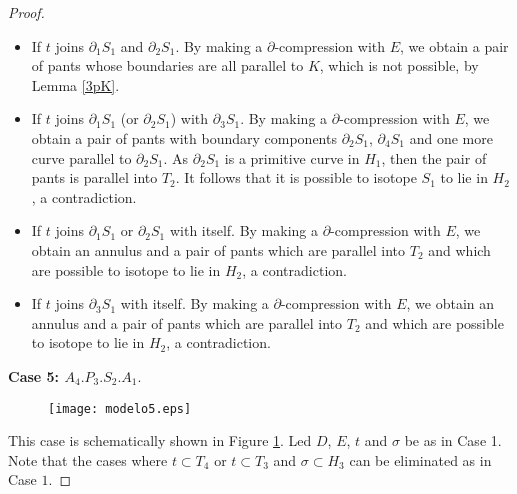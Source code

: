 \documentclass[12pt]{amsart}
\begin{document}
\begin{proof}
\begin{itemize}
    \item If $t$ joins $\partial_1 S_1$ and $\partial_2 S_1$. By making a $\partial$-compression with $E$, we obtain a pair of pants whose boundaries are all parallel to $K$, which is not possible, by Lemma \ref{3pK}.
    
    \item If $t$ joins $\partial_1 S_1$ (or $\partial_2 S_1$) with $\partial_3 S_1$. By making a $\partial$-compression with $E$, we obtain a pair of pants with boundary components $\partial _2 S_1$, $\partial_4 S_1$ and one more curve parallel to $\partial_2 S_1$. As $\partial_2 S_1$ is a primitive curve in $H_1$, then the pair of pants is parallel into $T_2$.  It follows that it is possible to isotope $S_1$ to lie in $H_2$, a contradiction.
    
    \item If $t$ joins $\partial_1 S_1$ or $\partial_2 S_1$ with itself. By making a $\partial$-compression with $E$, we obtain an annulus and a pair of pants which are parallel into $T_2$ and which are possible to isotope to lie in $H_2$, a contradiction.
    
    \item If $t$ joins $\partial_3 S_1$ with itself. By making a $\partial$-compression with $E$, we obtain an annulus and a pair of pants which are parallel into $T_2$ and which are possible to isotope to lie in $H_2$, a contradiction.
\end{itemize}


\vspace{1cm}

{\bf{Case 5: $A_4.P_3.S_2.A_1$}}.


\begin{figure}
\begin{center}
\texttt{[image: modelo5.eps]}
\end{center}
\caption{}
\label{case5}
\end{figure}



This case is schematically shown in Figure \ref{case5}. Led $D$, $E$, $t$ and $\sigma$ be as in Case 1.
Note that the cases where $t\subset T_4$ or $t\subset T_3$ and $\sigma\subset H_3$ can be eliminated as in Case $1$.


\end{proof}
\end{document}
